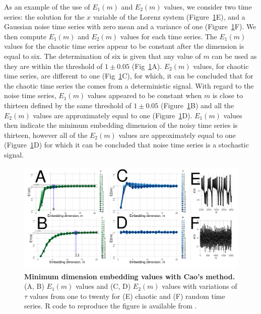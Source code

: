 As an example of the use of $E_1(m)$ and $E_2(m)$ values,
we consider two time series: the solution for the $x$ variable 
of the Lorenz system (Figure~\ref{fig:e1e2}E), and 
a Gaussian noise time series with zero mean and a variance of one 
(Figure~\ref{fig:e1e2}F).
We then compute $E_1(m)$ and $E_2(m)$ values for each time series.
The $E_1(m)$ values for the chaotic time series appear to be constant
after the dimension is equal to six.
The determination of six is given that any value of $m$ can be used as they are within 
the threshold of $1\pm0.05$ (Fig~\ref{fig:e1e2}A).
$E_2(m)$ values, for chaotic time series, are different to one (Fig~\ref{fig:e1e2}C),
for which, it can be concluded that for the chaotic time series the comes 
from a deterministic signal.
With regard to the noise time series,  $E_1(m)$ values appeared to be constant
when $m$ is close to thirteen defined by the same threshold of $1\pm0.05$ (Figure~\ref{fig:e1e2}B) 
and all the $E_2(m)$ values are approximately equal to one (Figure~\ref{fig:e1e2}D). 
$E_1(m)$ values then indicate the minimum embedding dimension of the noisy time series is thirteen,
however all of the $E_2(m)$ values are approximately equal to one (Figure~\ref{fig:e1e2}D)
for which it can be concluded that noise time series
is a stochastic signal.
\begin{figure}
  \centering
  \includegraphics[width=1.0\textwidth]{cao}
    \caption{
	{\bf Minimum dimension embedding values with Cao's method.} 
	(A, B) $E_1 (m)$ values and (C, D) $E_2(m)$ values 
	with variations of $\tau$ values from one to twenty
	for (E) chaotic and (F) random time series.
	R code to reproduce the figure is available from \cite{hwum2018}.
        }
    \label{fig:e1e2}
\end{figure}

